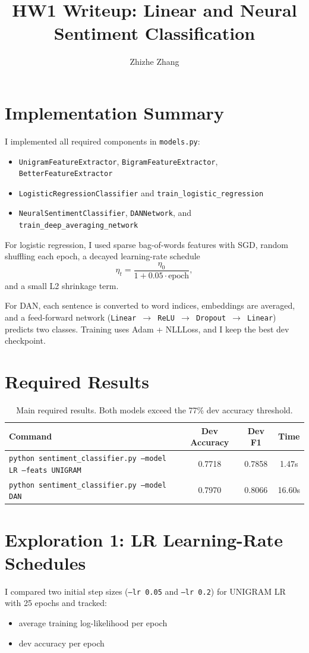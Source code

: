 \documentclass[11pt]{article}
\title{HW1 Writeup: Linear and Neural Sentiment Classification}
\author{Zhizhe Zhang}
\date{}
\begin{document}
\maketitle

\section{Implementation Summary}
I implemented all required components in \texttt{models.py}:
\begin{itemize}
    \item \texttt{UnigramFeatureExtractor}, \texttt{BigramFeatureExtractor}, \texttt{BetterFeatureExtractor}
    \item \texttt{LogisticRegressionClassifier} and \texttt{train\_logistic\_regression}
    \item \texttt{NeuralSentimentClassifier}, \texttt{DANNetwork}, and \texttt{train\_deep\_averaging\_network}
\end{itemize}

For logistic regression, I used sparse bag-of-words features with SGD, random shuffling each epoch, a decayed learning-rate schedule
\[
\eta_t = \frac{\eta_0}{1 + 0.05 \cdot \text{epoch}},
\]
and a small L2 shrinkage term.

For DAN, each sentence is converted to word indices, embeddings are averaged, and a feed-forward network
(\texttt{Linear $\to$ ReLU $\to$ Dropout $\to$ Linear}) predicts two classes. Training uses Adam + NLLLoss, and I keep the best dev checkpoint.

\section{Required Results}
\begin{table}[h]
\centering
\begin{tabular}{lccc}
\toprule
Command & Dev Accuracy & Dev F1 & Time \\
\midrule
\texttt{python sentiment\_classifier.py --model LR --feats UNIGRAM} & 0.7718 & 0.7858 & 1.47s \\
\texttt{python sentiment\_classifier.py --model DAN} & 0.7970 & 0.8066 & 16.60s \\
\bottomrule
\end{tabular}
\caption{Main required results. Both models exceed the 77\% dev accuracy threshold.}
\end{table}

\section{Exploration 1: LR Learning-Rate Schedules}
I compared two initial step sizes (\texttt{--lr 0.05} and \texttt{--lr 0.2}) for UNIGRAM LR with 25 epochs and tracked:
\begin{itemize}
    \item average training log-likelihood per epoch
    \item dev accuracy per epoch
\end{itemize}
\end{document}
